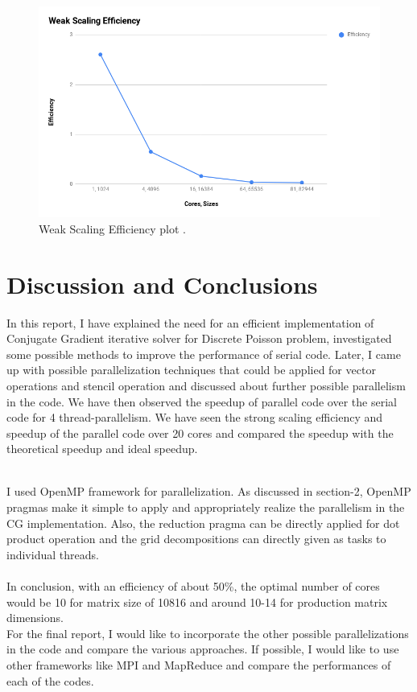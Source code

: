 \documentclass{article}
\begin{document}
\begin{spacing}{1.1}
\begin{center}
	\begin{figure}[H]
	\centering
       \includegraphics[scale=.40]{weakscaling.png}
        \caption{\label{weakscaling} Weak Scaling Efficiency plot .} 
	\end{figure}
\end{center}


\section{Discussion and Conclusions}

In this report, I have explained the need for an efficient implementation of Conjugate Gradient iterative solver for Discrete Poisson problem, investigated some possible methods to improve the performance of serial code. Later, I came up with possible parallelization techniques that could be applied for vector operations and stencil operation and discussed about further possible parallelism in the code. We have then observed the speedup of parallel code over the serial code for 4 thread-parallelism. We have seen the strong scaling efficiency and speedup of the parallel code over 20 cores and compared the speedup with the theoretical speedup and ideal speedup. 

\\
I used OpenMP framework for parallelization. As discussed in section-2, OpenMP pragmas make it simple to apply and appropriately realize the parallelism in the CG implementation. Also, the reduction pragma can be directly applied for dot product operation and the grid decompositions can directly given as tasks to individual threads. \\
\\
In conclusion, with an efficiency of about 50\%, the optimal number of cores would be 10 for matrix size of 10816 and around 10-14 for production matrix dimensions. 
\\
For the final report, I would like to incorporate the other possible parallelizations in the code and compare the various approaches. If possible, I would like to use other frameworks like MPI and MapReduce and compare the performances of each of the codes. 



\end{spacing}
\end{document}
